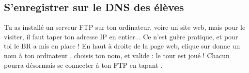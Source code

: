 \subsection{S'enregistrer sur le DNS des élèves}
\label{dnsapp}

Tu as installé un serveur FTP sur ton ordinateur, voire un site web, mais pour le visiter, il faut taper ton adresse IP en entier...
Ce n'est guère pratique, et pour toi le BR a mis en place  !
En haut à droite de la page web, clique sur \og donne un nom à ton ordinateur \fg, choisis ton nom, et valide : le tour est joué ! Chacun pourra désormais se connecter à ton FTP en tapant .
